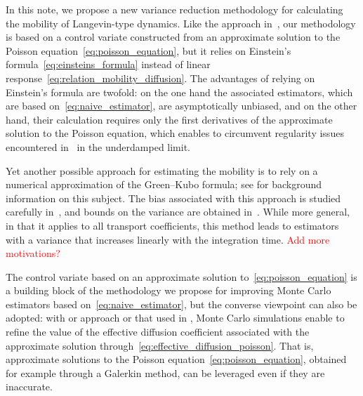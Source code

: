 \documentclass[11pt,a4paper]{article}
\theoremstyle{plain}
\numberwithin{equation}{section}
\begin{document}
In this note,
we propose a new variance reduction methodology for calculating the mobility of Langevin-type dynamics.
Like the approach in~\cite{roussel_thesis},
our methodology is based on a control variate constructed from an approximate solution to the Poisson equation~\eqref{eq:poisson_equation},
but it relies on Einstein's formula~\eqref{eq:einsteins_formula} instead of linear response~\eqref{eq:relation_mobility_diffusion}.
The advantages of relying on Einstein's formula are twofold:
on the one hand the associated estimators, which are based on~\eqref{eq:naive_estimator},
are asymptotically unbiased,
and on the other hand,
their calculation requires only the first derivatives of the approximate solution to the Poisson equation,
which enables to circumvent regularity issues encountered in~\cite{roussel_thesis} in the underdamped limit.

Yet another possible approach for estimating the mobility is to rely on a numerical approximation of the Green--Kubo formula;
see \cite[Section 5.1.3]{MR3509213} for background information on this subject.
The bias associated with this approach is studied carefully in~\cite{LMS16},
and bounds on the variance are obtained in~\cite{PSW21}.
While more general, in that it applies to all transport coefficients,
this method leads to estimators with a variance that increases linearly with the integration time.
\textcolor{red}{Add more motivations?}

The control variate based on an approximate solution to~\eqref{eq:poisson_equation} is a building block of the methodology we propose for improving Monte Carlo estimators based on~\eqref{eq:naive_estimator},
but the converse viewpoint can also be adopted:
with or approach or that used in \cite{roussel_thesis},
Monte Carlo simulations enable to refine the value of the effective diffusion coefficient associated with the approximate solution through~\eqref{eq:effective_diffusion_poisson}.
That is, approximate solutions to the Poisson equation~\eqref{eq:poisson_equation},
obtained for example through a Galerkin method,
can be leveraged even if they are inaccurate.
\end{document}
